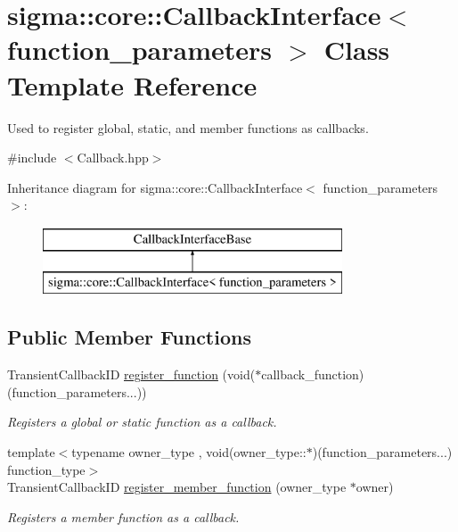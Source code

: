 \hypertarget{classsigma_1_1core_1_1_callback_interface}{}\section{sigma\+:\+:core\+:\+:Callback\+Interface$<$ function\+\_\+parameters $>$ Class Template Reference}
\label{classsigma_1_1core_1_1_callback_interface}


Used to register global, static, and member functions as callbacks.  




{\ttfamily \#include $<$Callback.\+hpp$>$}

Inheritance diagram for sigma\+:\+:core\+:\+:Callback\+Interface$<$ function\+\_\+parameters $>$\+:\begin{figure}[H]
\begin{center}
\leavevmode
\includegraphics[height=2.000000cm]{classsigma_1_1core_1_1_callback_interface}
\end{center}
\end{figure}
\subsection*{Public Member Functions}
\begin{DoxyCompactItemize}
\item 
Transient\+Callback\+I\+D \hyperlink{classsigma_1_1core_1_1_callback_interface_a447678d82d322396c293aabc534e4e96}{register\+\_\+function} (void($\ast$callback\+\_\+function)(function\+\_\+parameters...))
\begin{DoxyCompactList}\small\item\em Registers a global or static function as a callback. \end{DoxyCompactList}\item 
{\footnotesize template$<$typename owner\+\_\+type , void(owner\+\_\+type\+::$\ast$)(function\+\_\+parameters...) function\+\_\+type$>$ }\\Transient\+Callback\+I\+D \hyperlink{classsigma_1_1core_1_1_callback_interface_aea30ba6ae89d5638e91db8ba2207854a}{register\+\_\+member\+\_\+function} (owner\+\_\+type $\ast$owner)
\begin{DoxyCompactList}\small\item\em Registers a member function as a callback. \end{DoxyCompactList}\end{DoxyCompactItemize}
